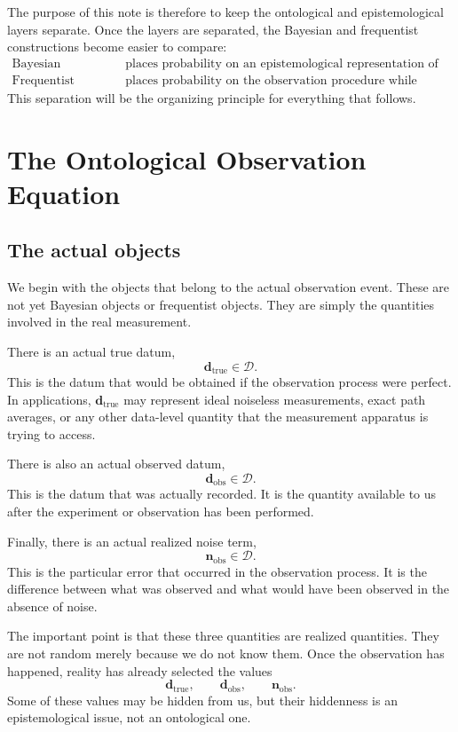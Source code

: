 \documentclass[11pt]{article}
\newcommand{\Dspace}{\mathcal D}
\newcommand{\dtrue}{\mathbf d_{\mathrm{true}}}
\newcommand{\dobs}{\mathbf d_{\mathrm{obs}}}
\newcommand{\nobs}{\mathbf n_{\mathrm{obs}}}
\begin{document}
The purpose of this note is therefore to keep the ontological and epistemological layers separate. Once the layers are separated, the Bayesian and frequentist constructions become easier to compare:
\[
\begin{aligned}
    \text{Bayesian inference}
    &\text{ places probability on an epistemological representation of the truth,}
    \\
    \text{Frequentist inference}
    &\text{ places probability on the observation procedure while keeping the truth fixed.}
\end{aligned}
\]
This separation will be the organizing principle for everything that follows.


\section{The Ontological Observation Equation}

\subsection{The actual objects}

We begin with the objects that belong to the actual observation event. These are not yet Bayesian objects or frequentist objects. They are simply the quantities involved in the real measurement.

There is an actual true datum,
\[
    \dtrue \in \Dspace.
\]
This is the datum that would be obtained if the observation process were perfect. In applications, \(\dtrue\) may represent ideal noiseless measurements, exact path averages, or any other data-level quantity that the measurement apparatus is trying to access.

There is also an actual observed datum,
\[
    \dobs \in \Dspace.
\]
This is the datum that was actually recorded. It is the quantity available to us after the experiment or observation has been performed.

Finally, there is an actual realized noise term,
\[
    \nobs \in \Dspace.
\]
This is the particular error that occurred in the observation process. It is the difference between what was observed and what would have been observed in the absence of noise.

The important point is that these three quantities are realized quantities. They are not random merely because we do not know them. Once the observation has happened, reality has already selected the values
\[
    \dtrue,
    \qquad
    \dobs,
    \qquad
    \nobs.
\]
Some of these values may be hidden from us, but their hiddenness is an epistemological issue, not an ontological one.
\end{document}
